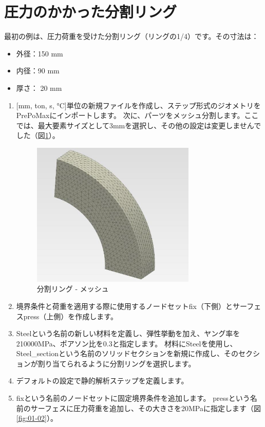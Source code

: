 \section{圧力のかかった分割リング}
最初の例は、圧力荷重を受けた分割リング（リングの1/4）です。その寸法は：
\begin{itemize}
\item 外径：150 mm
\item 内径：90 mm
\item 厚さ： 20 mm
\end{itemize}
\begin{enumerate}
\item
	{[}mm, ton, s, °C{]}単位の新規ファイルを作成し、ステップ形式のジオメトリをPrePoMaxにインポートします。
	次に、パーツをメッシュ分割します。ここでは、最大要素サイズとして3mmを選択し、その他の設定は変更しませんでした（図\ref{fig:01-01}）。
	\begin{figure}[H]
	\centering
	\includegraphics[width=78mm]{fig/01-01.png}
	\caption{分割リング - メッシュ}
	\label{fig:01-01}
	\end{figure}
\item
	境界条件と荷重を適用する際に使用するノードセットfix（下側）とサーフェスpress（上側）を作成します。
\item 
	Steelという名前の新しい材料を定義し、弾性挙動を加え、ヤング率を210000MPa、ポアソン比を0.3と指定します。
	材料にSteelを使用し、Steel\_sectionという名前のソリッドセクションを新規に作成し、そのセクションが割り当てられるように分割リングを選択します。
\item
	デフォルトの設定で静的解析ステップを定義します。
\item
	fixという名前のノードセットに固定境界条件を追加します。
	pressという名前のサーフェスに圧力荷重を追加し、その大きさを20MPaに指定します（図\ref{fig:01-02}）。
	\begin{figure}[H]
	\centering

\end{figure}
\end{enumerate}
